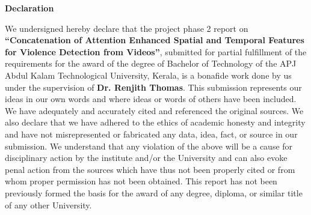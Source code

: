\newpage
\thispagestyle{empty}
\begin{center}
  \vspace*{1cm}
  \textbf{\large Declaration}
\end{center}
We undersigned hereby declare that the project phase 2 report on {\bf“Concatenation of Attention Enhanced Spatial and Temporal Features for Violence Detection from Videos”}, submitted for partial fulfillment of the requirements for the award of the degree of Bachelor of Technology of the APJ Abdul Kalam Technological University, Kerala, is a bonafide work done by us under the supervision of {\bf Dr. Renjith Thomas}. This submission represents our ideas in our own words and where ideas or words of others have been included. We have adequately and accurately cited and referenced the original sources. We also declare that we have adhered to the ethics of academic honesty and integrity and have not misrepresented or fabricated any data, idea, fact, or source in our submission. We understand that any violation of the above will be a cause for disciplinary action by the institute and/or the University and can also evoke penal action from the sources which have thus not been properly cited or from whom proper permission has not been obtained. This report has not been previously formed the basis for the award of any degree, diploma, or similar title of any other University. 
\vspace{1.3 cm} \\

